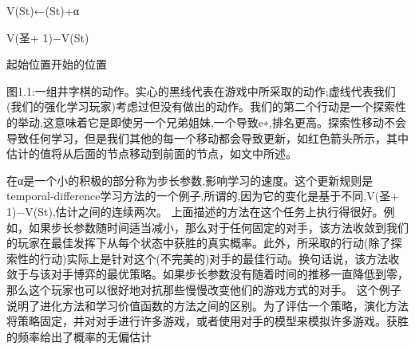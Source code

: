 V(St)←(St)+α

V(圣+ 1)−V(St)


起始位置开始的位置


图1.1:一组井字棋的动作。实心的黑线代表在游戏中所采取的动作;虚线代表我们(我们的强化学习玩家)考虑过但没有做出的动作。我们的第二个行动是一个探索性的举动,这意味着它是即使另一个兄弟姐妹,一个导致e∗,排名更高。探索性移动不会导致任何学习，但是我们其他的每一个移动都会导致更新，如红色箭头所示，其中估计的值将从后面的节点移动到前面的节点，如文中所述。


在α是一个小的积极的部分称为步长参数,影响学习的速度。这个更新规则是temporal-difference学习方法的一个例子,所谓的,因为它的变化是基于不同,V(圣+ 1)−V(St),估计之间的连续两次。
上面描述的方法在这个任务上执行得很好。例如，如果步长参数随时间适当减小，那么对于任何固定的对手，该方法收敛到我们的玩家在最佳发挥下从每个状态中获胜的真实概率。此外，所采取的行动(除了探索性的行动)实际上是针对这个(不完美的)对手的最佳行动。换句话说，该方法收敛于与该对手博弈的最优策略。如果步长参数没有随着时间的推移一直降低到零，那么这个玩家也可以很好地对抗那些慢慢改变他们的游戏方式的对手。
这个例子说明了进化方法和学习价值函数的方法之间的区别。为了评估一个策略，演化方法将策略固定，并对对手进行许多游戏，或者使用对手的模型来模拟许多游戏。获胜的频率给出了概率的无偏估计


